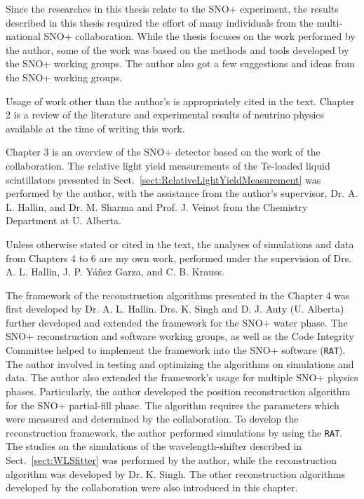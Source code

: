 Since the researches in this thesis relate to the SNO+ experiment, the results described in this thesis required the effort of many individuals from the multi-national SNO+ collaboration. While the thesis focuses on the work performed by the author, some of the work was based on the methods and tools developed by the SNO+ working groups. The author also got a few suggestions and ideas from the SNO+ working groups.

Usage of work other than the author's is appropriately cited in the text. Chapter 2 is a review of the literature and experimental results of neutrino physics available at the time of writing this work. 

Chapter 3 is an overview of the SNO+ detector based on the work of the collaboration. The relative light yield measurements of the Te-loaded liquid scintillators presented in Sect.~\ref{sect:RelativeLightYieldMeasurement} was performed by the author, with the assistance from the author's supervisor, Dr. A. L. Hallin, and Dr. M. Sharma and Prof. J. Veinot from the Chemistry Department at U. Alberta.

Unless otherwise stated or cited in the text, the analyses of simulations and data from Chapters 4 to 6 are my own work, performed under the supervision of Drs. A. L. Hallin, J. P. Y\'{a}\~{n}ez Garza, and C. B. Krauss. 

The framework of the reconstruction algorithms presented in the Chapter 4 was first developed by Dr. A. L. Hallin. Drs. K. Singh and D. J. Auty (U. Alberta) further developed and extended the framework for the SNO+ water phase. The SNO+ reconstruction and software working groups, as well as the Code Integrity Committee helped to implement the framework into the SNO+ software (\texttt{RAT}). The author involved in testing and optimizing the algorithms on simulations and data. The author also extended the framework's usage for multiple SNO+ physics phases. Particularly, the author developed the position reconstruction algorithm for the SNO+ partial-fill phase. The algorithm requires the parameters which were measured and determined by the collaboration. To develop the reconstruction framework, the author performed simulations by using the \texttt{RAT}. The studies on the simulations of the wavelength-shifter described in Sect.~\ref{sect:WLSfitter} was performed by the author, while the reconstruction algorithm was developed by Dr. K. Singh. The other reconstruction algorithms developed by the collaboration were also introduced in this chapter. 

